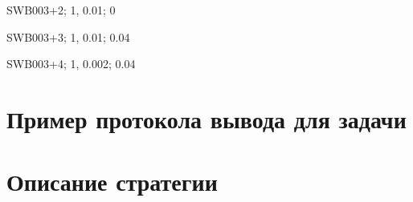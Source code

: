 SWB003+2; 1, 0.01; 0

SWB003+3; 1, 0.01; 0.04

SWB003+4; 1, 0.002; 0.04






\section*{Пример протокола вывода для задачи}


\section*{Описание стратегии}



